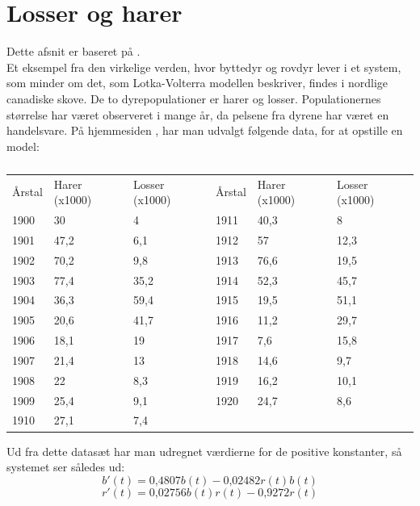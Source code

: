 \section{Losser og harer}
Dette afsnit er baseret på \citep{Lynx}. \\ \hfill \break
Et eksempel fra den virkelige verden, hvor byttedyr og rovdyr lever i et system, som minder om det, som Lotka-Volterra modellen beskriver, findes i nordlige canadiske skove. De to dyrepopulationer er harer og losser. Populationernes størrelse har været observeret i mange år, da pelsene fra dyrene har været en handelsvare. På hjemmesiden \citep{Lynx}, har man udvalgt følgende data, for at opstille en model:
\begin{table}[H]
\centering
\caption{\citep{Lynx}}
\label{my-label}
\begin{tabular}{llllll}
Årstal & Harer (x1000) & Losser (x1000) & Årstal & Harer (x1000) & Losser (x1000) \\
1900   & 30            & 4              & 1911   & 40,3          & 8              \\
1901   & 47,2          & 6,1            & 1912   & 57            & 12,3           \\
1902   & 70,2          & 9,8            & 1913   & 76,6          & 19,5           \\
1903   & 77,4          & 35,2           & 1914   & 52,3          & 45,7           \\
1904   & 36,3          & 59,4           & 1915   & 19,5          & 51,1           \\
1905   & 20,6          & 41,7           & 1916   & 11,2          & 29,7           \\
1906   & 18,1          & 19             & 1917   & 7,6           & 15,8           \\
1907   & 21,4          & 13             & 1918   & 14,6          & 9,7            \\
1908   & 22            & 8,3            & 1919   & 16,2          & 10,1           \\
1909   & 25,4          & 9,1            & 1920   & 24,7          & 8,6            \\
1910   & 27,1          & 7,4            &        &               &               
\end{tabular}
\end{table}
\hfill \break
Ud fra dette datasæt har man udregnet værdierne for de positive konstanter, så systemet ser således ud:
$$b'(t)=0\text{,}4807b(t)-0\text{,}02482r(t)b(t)$$
$$r'(t) = 0\text{,}02756b(t)r(t)-0\text{,}9272r(t)$$
